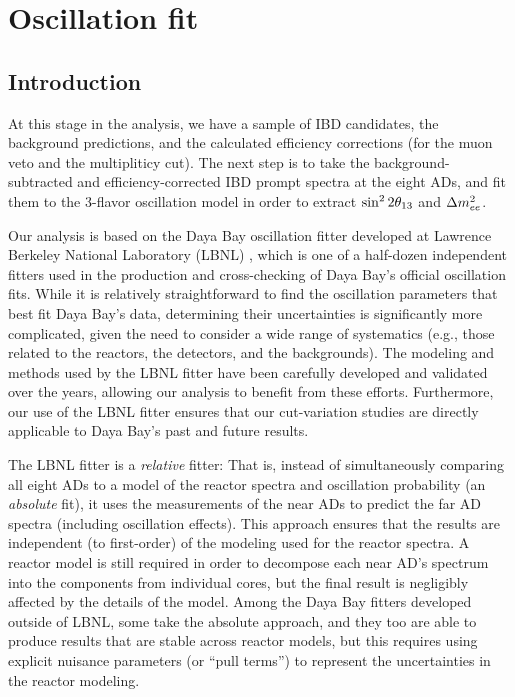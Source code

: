 \documentclass[../thesis.tex]{subfiles}
\begin{document}
\chapter{Oscillation fit}
\label{chap:fitting}

\section{Introduction}
\label{sec:fittingIntro}

At this stage in the analysis, we have a sample of IBD candidates, the background predictions, and the calculated efficiency corrections (for the muon veto and the multipliticy cut). The next step is to take the background-subtracted and efficiency-corrected IBD prompt spectra at the eight ADs, and fit them to the 3-flavor oscillation model in order to extract $\sin^2 2\theta_{13}$ and $\Delta m^2_{ee}$.

Our analysis is based on the Daya Bay oscillation fitter developed at Lawrence Berkeley National Laboratory (LBNL) \cite{berkeley_shapefit,berkeley_toymc}, which is one of a half-dozen independent fitters used in the production and cross-checking of Daya Bay's official oscillation fits. While it is relatively straightforward to find the oscillation parameters that best fit Daya Bay's data, determining their uncertainties is significantly more complicated, given the need to consider a wide range of systematics (e.g., those related to the reactors, the detectors, and the backgrounds). The modeling and methods used by the LBNL fitter have been carefully developed and validated over the years, allowing our analysis to benefit from these efforts. Furthermore, our use of the LBNL fitter ensures that our cut-variation studies are directly applicable to Daya Bay's past and future results.

The LBNL fitter is a \emph{relative} fitter: That is, instead of simultaneously comparing all eight ADs to a model of the reactor spectra and oscillation probability (an \emph{absolute} fit), it uses the measurements of the near ADs to predict the far AD spectra (including oscillation effects). This approach ensures that the results are independent (to first-order) of the modeling used for the reactor spectra. A reactor model is still required in order to decompose each near AD's spectrum into the components from individual cores, but the final result is negligibly affected by the details of the model. Among the Daya Bay fitters developed outside of LBNL, some take the absolute approach, and they too are able to produce results that are stable across reactor models, but this requires using explicit nuisance parameters (or ``pull terms'') to represent the uncertainties in the reactor modeling.
\end{document}

